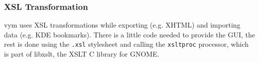 \documentclass[12pt,a4paper]{article}
\newcommand{\vym}{{\sc vym }}
\begin{document}
\begin{appendix}
\subsubsection*{XSL Transformation}
\vym uses XSL transformations while exporting (e.g. XHTML) and importing
data (e.g. KDE bookmarks). There is a little code needed to provide the
GUI, the rest is done using the {\tt .xsl} stylesheet and calling the
{\tt xsltproc} processor, which is part of libxslt, the XSLT
C  library  for  GNOME. 

\end{appendix}
\end{document}
